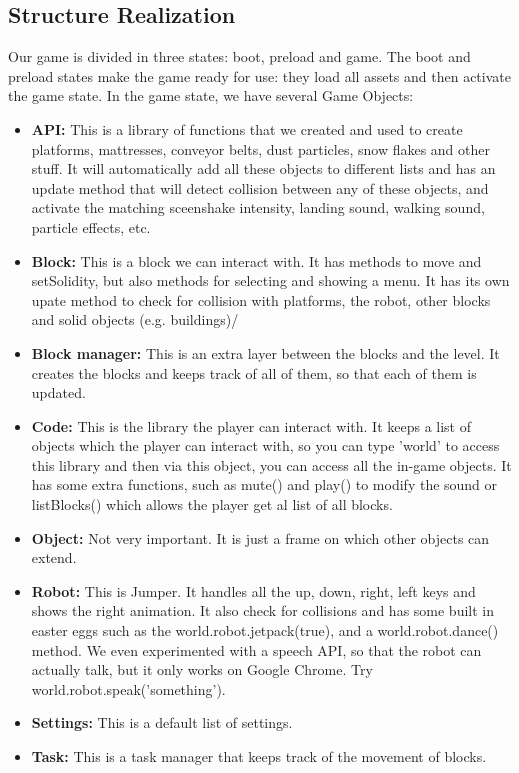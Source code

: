 \documentclass[a4paper,twoside,12pt]{article}
\begin{document}
\subsection{Structure Realization}
Our game is divided in three states: boot, preload and game. The boot and preload states make the game ready for use: they load all assets and then activate the game state. In the game state, we have several Game Objects:
\begin{itemize}
\item \textbf{API:} This is a library of functions that we created and used to create platforms, mattresses, conveyor belts, dust particles, snow flakes and other stuff. It will automatically add all these objects to different lists and has an update method that will detect collision between any of these objects, and activate the matching sceenshake intensity, landing sound, walking sound, particle effects, etc.
\item \textbf{Block: } This is a block we can interact with. It has methods to move and setSolidity, but also methods for selecting and showing a menu. It has its own upate method to check for collision with platforms, the robot, other blocks and solid objects (e.g. buildings)/
\item \textbf{Block manager: } This is an extra layer between the blocks and the level. It creates the blocks and keeps track of all of them, so that each of them is updated.
\item \textbf{Code: } This is the library the player can interact with. It keeps a list of objects which the player can interact with, so you can type 'world' to access this library and then via this object, you can access all the in-game objects. It has some extra functions, such as mute() and play() to modify the sound or listBlocks() which allows the player get al list of all blocks.
\item \textbf{Object: } Not very important. It is just a frame on which other objects can extend.
\item \textbf{Robot: } This is Jumper. It handles all the up, down, right, left keys and shows the right animation. It also check for collisions and has some built in easter eggs such as the world.robot.jetpack(true), and a world.robot.dance() method. We even experimented with a speech API, so that the robot can actually talk, but it only works on Google Chrome. Try world.robot.speak('something').
\item \textbf{Settings: } This is a default list of settings.
\item \textbf{Task: } This is a task manager that keeps track of the movement of blocks.
\end{itemize}
\end{document}
